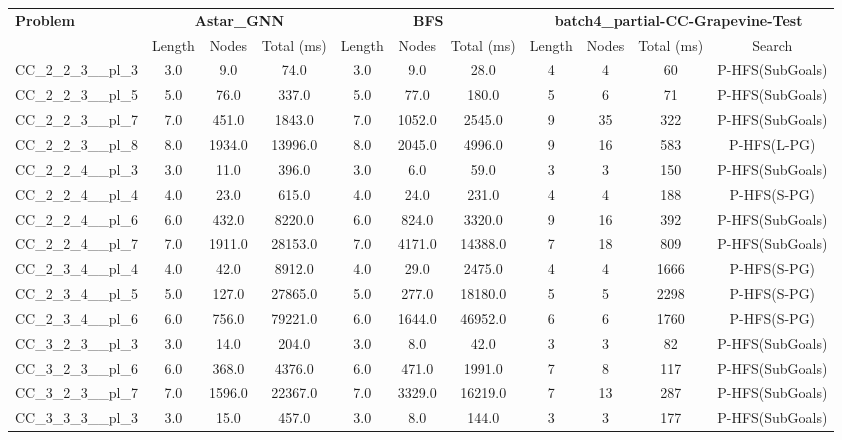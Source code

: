 \begin{table}[!ht]
\centering
\scriptsize
\begin{tabular}{l|ccc|ccc|cccc}
\multirow{2}{*}{\textbf{Problem}} & \multicolumn{3}{c|}{\textbf{Astar\_GNN}} & \multicolumn{3}{c|}{\textbf{BFS}} & \multicolumn{4}{c}{\textbf{batch4\_partial-CC-Grapevine-Test}} \\
\cline{2-11}
& Length & Nodes & Total (ms) & Length & Nodes & Total (ms) & Length & Nodes & Total (ms) & Search \\
\hline
CC\_2\_2\_3\_\_pl\_3 & 3.0 & 9.0 & 74.0 & 3.0 & 9.0 & 28.0 & 4 & 4 & 60 & P-HFS(SubGoals) \\
CC\_2\_2\_3\_\_pl\_5 & 5.0 & 76.0 & 337.0 & 5.0 & 77.0 & 180.0 & 5 & 6 & 71 & P-HFS(SubGoals) \\
CC\_2\_2\_3\_\_pl\_7 & 7.0 & 451.0 & 1843.0 & 7.0 & 1052.0 & 2545.0 & 9 & 35 & 322 & P-HFS(SubGoals) \\
CC\_2\_2\_3\_\_pl\_8 & 8.0 & 1934.0 & 13996.0 & 8.0 & 2045.0 & 4996.0 & 9 & 16 & 583 & P-HFS(L-PG) \\
CC\_2\_2\_4\_\_pl\_3 & 3.0 & 11.0 & 396.0 & 3.0 & 6.0 & 59.0 & 3 & 3 & 150 & P-HFS(SubGoals) \\
CC\_2\_2\_4\_\_pl\_4 & 4.0 & 23.0 & 615.0 & 4.0 & 24.0 & 231.0 & 4 & 4 & 188 & P-HFS(S-PG) \\
CC\_2\_2\_4\_\_pl\_6 & 6.0 & 432.0 & 8220.0 & 6.0 & 824.0 & 3320.0 & 9 & 16 & 392 & P-HFS(SubGoals) \\
CC\_2\_2\_4\_\_pl\_7 & 7.0 & 1911.0 & 28153.0 & 7.0 & 4171.0 & 14388.0 & 7 & 18 & 809 & P-HFS(SubGoals) \\
CC\_2\_3\_4\_\_pl\_4 & 4.0 & 42.0 & 8912.0 & 4.0 & 29.0 & 2475.0 & 4 & 4 & 1666 & P-HFS(S-PG) \\
CC\_2\_3\_4\_\_pl\_5 & 5.0 & 127.0 & 27865.0 & 5.0 & 277.0 & 18180.0 & 5 & 5 & 2298 & P-HFS(S-PG) \\
CC\_2\_3\_4\_\_pl\_6 & 6.0 & 756.0 & 79221.0 & 6.0 & 1644.0 & 46952.0 & 6 & 6 & 1760 & P-HFS(S-PG) \\
CC\_3\_2\_3\_\_pl\_3 & 3.0 & 14.0 & 204.0 & 3.0 & 8.0 & 42.0 & 3 & 3 & 82 & P-HFS(SubGoals) \\
CC\_3\_2\_3\_\_pl\_6 & 6.0 & 368.0 & 4376.0 & 6.0 & 471.0 & 1991.0 & 7 & 8 & 117 & P-HFS(SubGoals) \\
CC\_3\_2\_3\_\_pl\_7 & 7.0 & 1596.0 & 22367.0 & 7.0 & 3329.0 & 16219.0 & 7 & 13 & 287 & P-HFS(SubGoals) \\
CC\_3\_3\_3\_\_pl\_3 & 3.0 & 15.0 & 457.0 & 3.0 & 8.0 & 144.0 & 3 & 3 & 177 & P-HFS(SubGoals) \\

\end{tabular}
\end{table}
